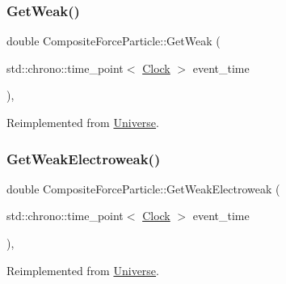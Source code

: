 \subsubsection{\texorpdfstring{Get\+Weak()}{GetWeak()}}
{\footnotesize\ttfamily double Composite\+Force\+Particle\+::\+Get\+Weak (\begin{DoxyParamCaption}\item[{std\+::chrono\+::time\+\_\+point$<$ \mbox{\hyperlink{universe_8h_a0ef8d951d1ca5ab3cfaf7ab4c7a6fd80}{Clock}} $>$}]{event\+\_\+time }\end{DoxyParamCaption})\hspace{0.3cm}{\ttfamily [inline]}, {\ttfamily [virtual]}}



Reimplemented from \mbox{\hyperlink{classUniverse_a4476b7e0a3fc1764909f556257fd9ec7}{Universe}}.

\mbox{\label{classCompositeForceParticle_a27762218af4e3c021c89ff4792d81b41}} 
\subsubsection{\texorpdfstring{Get\+Weak\+Electroweak()}{GetWeakElectroweak()}}
{\footnotesize\ttfamily double Composite\+Force\+Particle\+::\+Get\+Weak\+Electroweak (\begin{DoxyParamCaption}\item[{std\+::chrono\+::time\+\_\+point$<$ \mbox{\hyperlink{universe_8h_a0ef8d951d1ca5ab3cfaf7ab4c7a6fd80}{Clock}} $>$}]{event\+\_\+time }\end{DoxyParamCaption})\hspace{0.3cm}{\ttfamily [inline]}, {\ttfamily [virtual]}}



Reimplemented from \mbox{\hyperlink{classUniverse_a645299738e6b798a037f2a15a2e7cf4d}{Universe}}.

\mbox{\label{classCompositeForceParticle_afe5738b3ba1382dad085fa1ef39963b3}} 
